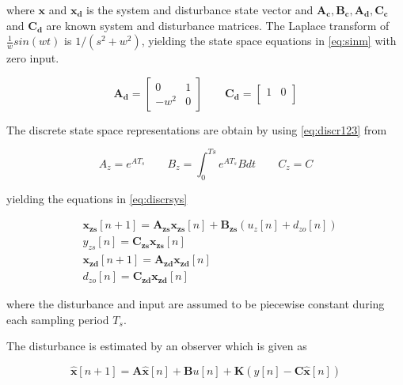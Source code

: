 where $\mathbf{x}$ and $\mathbf{x_d}$ is the system and disturbance state vector and $\mathbf{A_c, B_c, A_d, C_c}$ and $\mathbf{C_d}$ are known system and disturbance matrices. The Laplace transform of $\frac{1}{w}sin(wt)$ is $1/(s^2 + w^2)$, yielding the state space equations in \eqref{eq:sinm} with zero input.

\begin{equation}
  \label{eq:sinm}
  \mathbf{A_d} =
    \begin{bmatrix}
       0 & 1\\[0.3em]
       -w^2 & 0
     \end{bmatrix}
     \qquad
  \mathbf{C_d} =
    \begin{bmatrix}
        1 & 0\\
    \end{bmatrix}
\end{equation}

The discrete state space representations are obtain by using \eqref{eq:discr123} from \citep{industrial}

\begin{equation}
  \label{eq:discr123}
  A_z = e^{AT_s}  \qquad B_z = \int_{0}^{Ts} e^{AT_s}B dt \qquad C_z = C
\end{equation}

yielding the equations in \eqref{eq:discrsys}

\begin{subequations}
  \label{eq:discrsys}
  \begin{alignat}{2}
    & \mathbf{x_{zs}}[n + 1] = \mathbf{A_{zs}x_{zs}}[n] + \mathbf{B_{zs}}(u_z[n] + d_{zo}[n]) \\
    & y_{zs}[n] = \mathbf{C_{zs}x_{zs}}[n] \\
    & \mathbf{x_{zd}}[n + 1] = \mathbf{A_{zd}x_{zd}}[n]\\
    & d_{zo}[n] = \mathbf{C_{zd}x_{zd}}[n]
  \end{alignat}
\end{subequations}

where the disturbance and input are assumed to be piecewise constant during each sampling period $T_s$.

The disturbance is estimated by an observer which is given as

\begin{equation}
  \label{eq:obs}
  \mathbf{\hat{x}}[n + 1] = \mathbf{A\hat{x}}[n] + \mathbf{B}u[n] + \mathbf{K}(y[n] - \mathbf{C\hat{x}}[n])
\end{equation}

